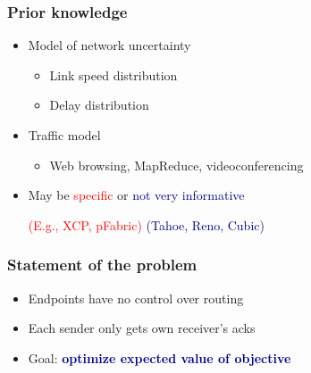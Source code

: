 \documentclass[svgnames]{beamer}
\begin{document}
\begin{frame}
\frametitle{Prior knowledge}

\begin{itemize}

\Large

\item Model of network uncertainty

\begin{itemize}
\item Link speed distribution
\item Delay distribution
\end{itemize}

\item Traffic model

\begin{itemize}
\item Web browsing, MapReduce, videoconferencing
\end{itemize}

\item May be \textcolor{Red}{specific} or \textcolor{DarkBlue}{not very informative} \\

\vspace{4 pt}

\tiny \hspace{1.6 cm} \textcolor{Red}{(E.g., XCP, pFabric)} \hspace{0.2 cm} \textcolor{DarkBlue}{(Tahoe, Reno, Cubic)}
\end{itemize}

\end{frame}

\begin{frame}
\frametitle{Statement of the problem}

\Large

\begin{itemize}

\item Endpoints have no control over routing

\item Each sender only gets own receiver's acks

\item Goal: \textbf{\textcolor{DarkBlue}{optimize expected value of objective}}


\end{itemize}

\end{frame}
\end{document}
